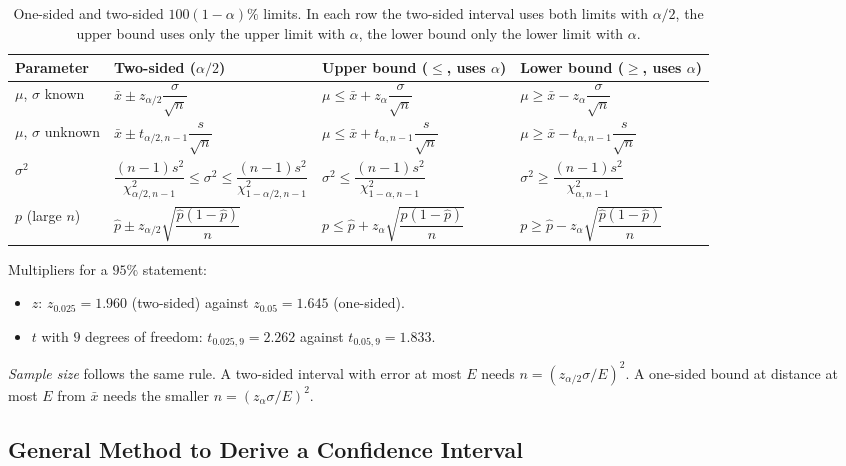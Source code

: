 \begin{table}
\caption{One-sided and two-sided $100(1-\alpha)\%$ limits. In each row the two-sided interval uses both limits with $\alpha/2$, the upper bound uses only the upper limit with $\alpha$, the lower bound only the lower limit with $\alpha$.}\label{tab:onetwo}
\centering\small
\begin{tabular}{p{2.6cm}p{3.6cm}p{3.9cm}p{3.9cm}}
\toprule
Parameter & Two-sided ($\alpha/2$) & Upper bound ($\le$, uses $\alpha$) & Lower bound ($\ge$, uses $\alpha$) \\
\midrule
$\mu$, $\sigma$ known & $\bar{x}\pm z_{\alpha/2}\dfrac{\sigma}{\sqrt n}$ & $\mu\le\bar{x}+z_\alpha\dfrac{\sigma}{\sqrt n}$ & $\mu\ge\bar{x}-z_\alpha\dfrac{\sigma}{\sqrt n}$ \\
$\mu$, $\sigma$ unknown & $\bar{x}\pm t_{\alpha/2,n-1}\dfrac{s}{\sqrt n}$ & $\mu\le\bar{x}+t_{\alpha,n-1}\dfrac{s}{\sqrt n}$ & $\mu\ge\bar{x}-t_{\alpha,n-1}\dfrac{s}{\sqrt n}$ \\
$\sigma^2$ & $\dfrac{(n-1)s^2}{\chi^2_{\alpha/2,n-1}}\le\sigma^2\le\dfrac{(n-1)s^2}{\chi^2_{1-\alpha/2,n-1}}$ & $\sigma^2\le\dfrac{(n-1)s^2}{\chi^2_{1-\alpha,n-1}}$ & $\sigma^2\ge\dfrac{(n-1)s^2}{\chi^2_{\alpha,n-1}}$ \\
$p$ (large $n$) & $\hat{p}\pm z_{\alpha/2}\sqrt{\dfrac{\hat{p}(1-\hat{p})}{n}}$ & $p\le\hat{p}+z_\alpha\sqrt{\dfrac{\hat{p}(1-\hat{p})}{n}}$ & $p\ge\hat{p}-z_\alpha\sqrt{\dfrac{\hat{p}(1-\hat{p})}{n}}$ \\
\bottomrule
\end{tabular}
\end{table}

Multipliers for a $95\%$ statement:
\begin{itemize}
  \item $z$: $z_{0.025}=1.960$ (two-sided) against $z_{0.05}=1.645$ (one-sided).
  \item $t$ with $9$ degrees of freedom: $t_{0.025,9}=2.262$ against $t_{0.05,9}=1.833$.
\end{itemize}

\emph{Sample size} follows the same rule. A two-sided interval with error at most $E$ needs $n=(z_{\alpha/2}\sigma/E)^2$. A one-sided bound at distance at most $E$ from $\bar{x}$ needs the smaller $n=(z_\alpha\sigma/E)^2$.

\subsection{General Method to Derive a Confidence Interval}

